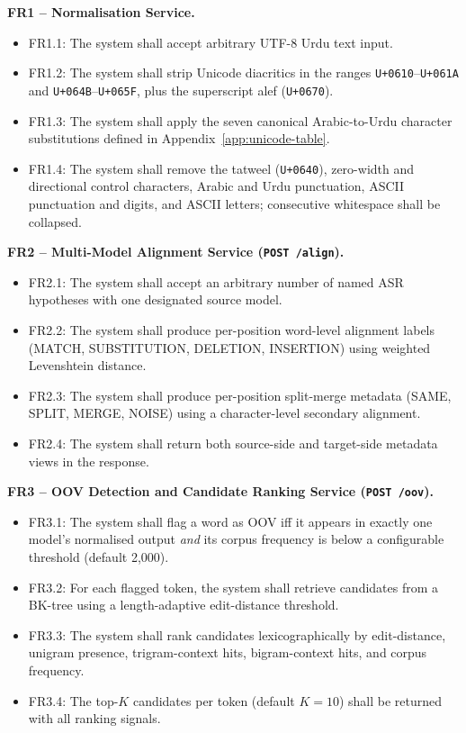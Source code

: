 \textbf{FR1 -- Normalisation Service.}
\begin{itemize}[nosep]
  \item FR1.1: The system shall accept arbitrary UTF-8 Urdu text input.
  \item FR1.2: The system shall strip Unicode diacritics in the ranges \texttt{U+0610}--\texttt{U+061A} and \texttt{U+064B}--\texttt{U+065F}, plus the superscript alef (\texttt{U+0670}).
  \item FR1.3: The system shall apply the seven canonical Arabic-to-Urdu character substitutions defined in Appendix~\ref{app:unicode-table}.
  \item FR1.4: The system shall remove the tatweel (\texttt{U+0640}), zero-width and directional control characters, Arabic and Urdu punctuation, ASCII punctuation and digits, and ASCII letters; consecutive whitespace shall be collapsed.
\end{itemize}

\textbf{FR2 -- Multi-Model Alignment Service (\texttt{POST /align}).}
\begin{itemize}[nosep]
  \item FR2.1: The system shall accept an arbitrary number of named ASR hypotheses with one designated source model.
  \item FR2.2: The system shall produce per-position word-level alignment labels (MATCH, SUBSTITUTION, DELETION, INSERTION) using weighted Levenshtein distance.
  \item FR2.3: The system shall produce per-position split-merge metadata (SAME, SPLIT, MERGE, NOISE) using a character-level secondary alignment.
  \item FR2.4: The system shall return both source-side and target-side metadata views in the response.
\end{itemize}

\textbf{FR3 -- OOV Detection and Candidate Ranking Service (\texttt{POST /oov}).}
\begin{itemize}[nosep]
  \item FR3.1: The system shall flag a word as OOV iff it appears in exactly one model's normalised output \emph{and} its corpus frequency is below a configurable threshold (default 2{,}000).
  \item FR3.2: For each flagged token, the system shall retrieve candidates from a BK-tree using a length-adaptive edit-distance threshold.
  \item FR3.3: The system shall rank candidates lexicographically by edit-distance, unigram presence, trigram-context hits, bigram-context hits, and corpus frequency.
  \item FR3.4: The top-$K$ candidates per token (default $K=10$) shall be returned with all ranking signals.
\end{itemize}

